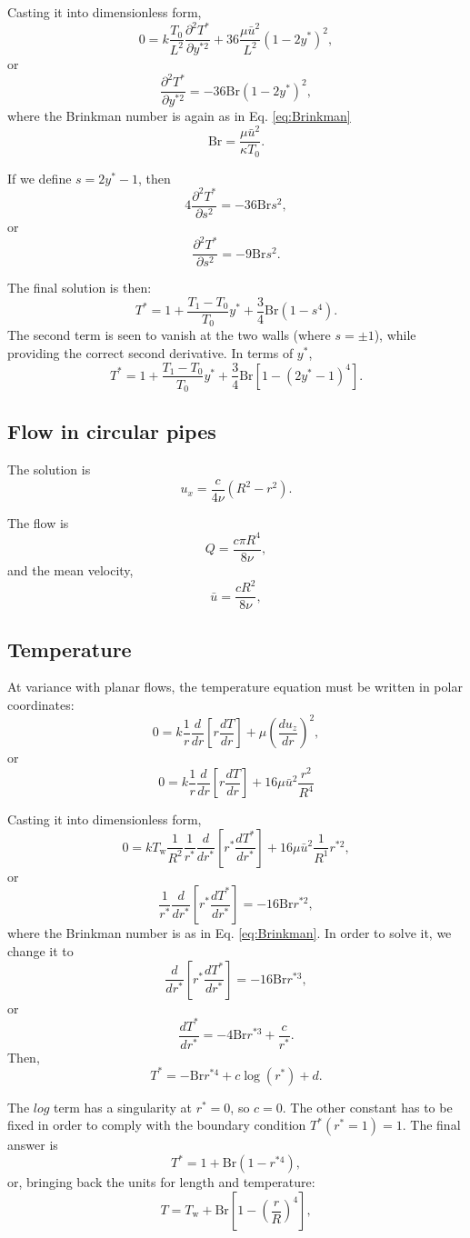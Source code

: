 Casting it into dimensionless form,
\[
0 =  k \frac{T_0}{ L^2} \frac{\partial^2 T^*}{\partial y^{*2}} +
36 \frac{\mu \bar{u}^2}{L^2}  \left( 1- 2 y^*  \right)^2 ,
\]
or
\[
 \frac{\partial^2 T^*}{\partial y^{*2}} = 
  - 36 \mathrm{Br} \left( 1- 2 y^*  \right)^2 ,
\]
where the Brinkman number is again as in Eq. \ref{eq:Brinkman}
\[
\mathrm{Br} =
\frac{ \mu \bar{u}^2 }{ \kappa T_0 } .
\]

If we define $s = 2  y^* - 1$, then
\[
 4 \frac{\partial^2 T^*}{\partial s^{2}} = 
 - 36 \mathrm{Br} s^2,
 \]
 or
\[
 \frac{\partial^2 T^*}{\partial s^{2}} = 
 - 9 \mathrm{Br} s^2.
\]


The final solution is then:
\[
T^* = 1 + \frac{T_1-T_0}{T_0} y^* +
\frac34 \mathrm{Br}  \left( 1 - s^{4} \right) .
\]
The second term is seen to vanish at the two walls (where $s=\pm 1$),
while providing the correct second derivative. In terms of $y^*$,
\[
T^* = 1 + \frac{T_1-T_0}{T_0} y^* +
\frac34 \mathrm{Br}  \left[ 1 -  \left( 2  y^* - 1 \right)^{4} \right] .
\]




\subsection{Flow in circular pipes}

The solution is
\[
u_x=\frac{c}{4\nu} \left( R^2 - r^2 \right) .
\]


The flow is
\[
Q= \frac{c \pi R^4}{8\nu} ,
\]
and the mean velocity,
\[
\bar{u}= \frac{c R^2}{8\nu} ,
\]



\subsection{Temperature}

At variance with planar flows, the temperature equation must be
written in polar coordinates:
\[
0 =
k
\frac{1}{r} \frac{d}{dr} \left[
  r \frac{dT}{dr} \right] +
\mu  \left( \frac{d u_z}{d r} \right)^2,
\]
or
\[
0 = k
\frac{1}{r} \frac{d}{dr}
\left[
  r \frac{dT}{dr}
\right] +
16 \mu  \bar{u}^2 \frac{r^2}{R^4}
\]

Casting it into dimensionless form,
\[
0 = k T_\mathrm{w}
\frac{1}{R^2}
\frac{1}{r^*} \frac{d}{dr^*}
\left[
  r^* \frac{dT^*}{dr^*}
\right] +
16 \mu  \bar{u}^2 \frac{1}{R^1} r^{*2},
\]
or
\[
\frac{1}{r^*} \frac{d}{dr^*}
\left[
  r^* \frac{dT^*}{dr^*}
\right] =
- 16 \mathrm{Br}  r^{*2},
\]
where the  Brinkman number is as in Eq. \ref{eq:Brinkman}.
In order to solve it, we change it to
\[
 \frac{d}{dr^*}
\left[
  r^* \frac{dT^*}{dr^*}
\right] =
 - 16 \mathrm{Br}  r^{*3},
\]
or
\[
 \frac{dT^*}{dr^*} =
 - 4 \mathrm{Br}  r^{*3} + \frac{c}{r^*} .
 \]
 Then,
\[
T^* = - \mathrm{Br}  r^{*4} + c \log( r^* ) + d .
 \]

 The $log$ term has a singularity at $r^*=0$, so $c=0$. The other
 constant has to be fixed in order to comply with the boundary
 condition $T^*(r^*=1)=1$. The final answer is
\[
T^* =  1 + \mathrm{Br} \left( 1 - r^{*4} \right) ,
\]
or, bringing back the units for length and temperature:
\[
T =  T_\mathrm{w}  + \mathrm{Br} \left[ 1 - \left(\frac{r}{R}\right)^4 \right] ,
\]
